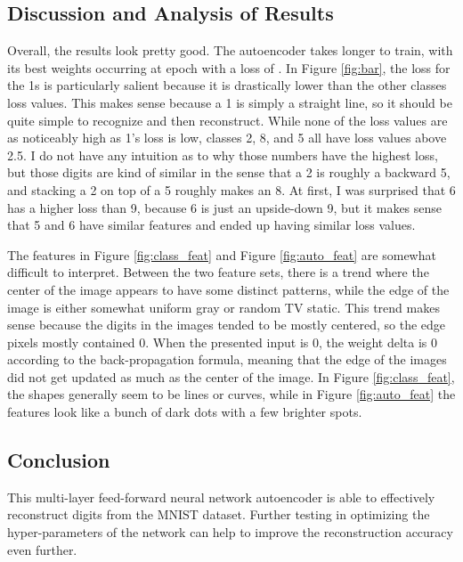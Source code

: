 \documentclass[a4paper, 12pt, titlepage]{article}
\newcommand{\figRef}[1]{Figure \ref{#1}}
\begin{document}
  \subsection{Discussion and Analysis of Results}
  \par Overall, the results look pretty good.
  The autoencoder takes longer to train, with its best weights occurring at
  epoch \unskip{} with a loss of
  \unskip{}.
  In \figRef{fig:bar}, the loss for the 1s is particularly salient because it
  is drastically lower than the other classes loss values.
  This makes sense because a 1 is simply a straight line, so it should be quite
  simple to recognize and then reconstruct.
  While none of the loss values are as noticeably high as 1's loss is low,
  classes 2, 8, and 5 all have loss values above 2.5.
  I do not have any intuition as to why those numbers have the highest loss,
  but those digits are kind of similar in the sense that a 2 is roughly a
  backward 5, and stacking a 2 on top of a 5 roughly makes an 8.
  At first, I was surprised that 6 has a higher loss than 9, because 6 is just
  an upside-down 9, but it makes sense that 5 and 6 have similar features and
  ended up having similar loss values.
  \par The features in \figRef{fig:class_feat} and \figRef{fig:auto_feat} are
  somewhat difficult to interpret.
  Between the two feature sets, there is a trend where the center of the image
  appears to have some distinct patterns, while the edge of the image is either
  somewhat uniform gray or random TV static.
  This trend makes sense because the digits in the images tended to be
  mostly centered, so the edge pixels mostly contained 0.
  When the presented input is 0, the weight delta is 0 according to the
  back-propagation formula, meaning that the edge of the images did not get
  updated as much as the center of the image.
  In \figRef{fig:class_feat}, the shapes generally seem to be lines or curves,
  while in \figRef{fig:auto_feat} the features look like a bunch of dark dots
  with a few brighter spots.


  \subsection{Conclusion}
  \par This multi-layer feed-forward neural network autoencoder is able to
  effectively reconstruct digits from the MNIST dataset.
  Further testing in optimizing the hyper-parameters of the network can help to
  improve the reconstruction accuracy even further.
\end{document}

